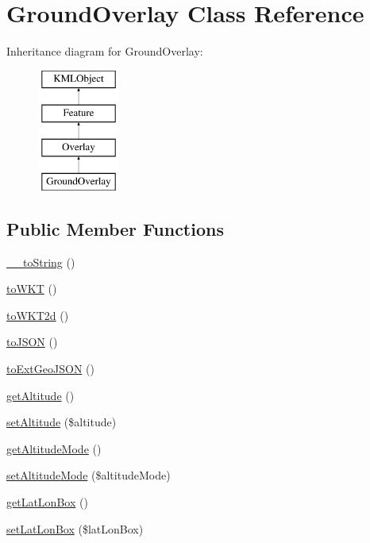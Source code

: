 \hypertarget{classGroundOverlay}{
\section{GroundOverlay Class Reference}
\label{d5/d77/classGroundOverlay}
}
Inheritance diagram for GroundOverlay:\begin{figure}[H]
\begin{center}
\leavevmode
\includegraphics[height=4.000000cm]{d5/d77/classGroundOverlay}
\end{center}
\end{figure}
\subsection*{Public Member Functions}
\begin{DoxyCompactItemize}
\item 
\hyperlink{classGroundOverlay_a6a8a3a8a9edf60e52f75c2d6ceb54409}{\_\-\_\-toString} ()
\item 
\hyperlink{classGroundOverlay_ab377e59df2ad3fcfe64d4830c9da37bb}{toWKT} ()
\item 
\hyperlink{classGroundOverlay_a64239a6c2c7372dea086a3401536c7e7}{toWKT2d} ()
\item 
\hyperlink{classGroundOverlay_a18da0b1a7ce45cc4c8a77747caa5bd29}{toJSON} ()
\item 
\hyperlink{classGroundOverlay_a9d7f71cc6cef3a47c15f9aa6f747ea3f}{toExtGeoJSON} ()
\item 
\hyperlink{classGroundOverlay_af794193f5ee3ace3da25682da40e1086}{getAltitude} ()
\item 
\hyperlink{classGroundOverlay_ab8b1a8f13c5916a76bd1a2ce19b66f23}{setAltitude} (\$altitude)
\item 
\hyperlink{classGroundOverlay_a4fb18f392b624f807d66794cabcf2629}{getAltitudeMode} ()
\item 
\hyperlink{classGroundOverlay_a0f276bea79e8e81808c9edc4035c19cb}{setAltitudeMode} (\$altitudeMode)
\item 
\hyperlink{classGroundOverlay_a0eecf7617002ea24a5cc1cd72e22206e}{getLatLonBox} ()
\item 
\hyperlink{classGroundOverlay_a28d2e1386a19dce87fccf9543c8df292}{setLatLonBox} (\$latLonBox)
\end{DoxyCompactItemize}


